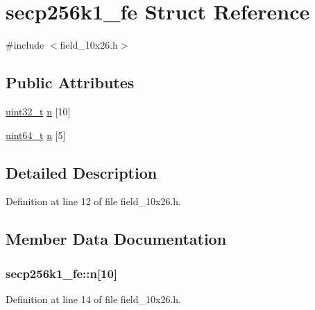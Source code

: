 \hypertarget{structsecp256k1__fe}{}\section{secp256k1\+\_\+fe Struct Reference}
\label{structsecp256k1__fe}


{\ttfamily \#include $<$field\+\_\+10x26.\+h$>$}

\subsection*{Public Attributes}
\begin{DoxyCompactItemize}
\item 
\hyperlink{stdint_8h_a435d1572bf3f880d55459d9805097f62}{uint32\+\_\+t} \hyperlink{structsecp256k1__fe_a4e7c00a989d1da635e7ffd33105d62df}{n} \mbox{[}10\mbox{]}
\item 
\hyperlink{stdint_8h_aaa5d1cd013383c889537491c3cfd9aad}{uint64\+\_\+t} \hyperlink{structsecp256k1__fe_a8159e965048d322e1ac8ee81060c535a}{n} \mbox{[}5\mbox{]}
\end{DoxyCompactItemize}


\subsection{Detailed Description}


Definition at line 12 of file field\+\_\+10x26.\+h.



\subsection{Member Data Documentation}
\hypertarget{structsecp256k1__fe_a4e7c00a989d1da635e7ffd33105d62df}{}
\subsubsection[{n}]{ secp256k1\+\_\+fe\+::n\mbox{[}10\mbox{]}}\label{structsecp256k1__fe_a4e7c00a989d1da635e7ffd33105d62df}


Definition at line 14 of file field\+\_\+10x26.\+h.

\hypertarget{structsecp256k1__fe_a8159e965048d322e1ac8ee81060c535a}{}
